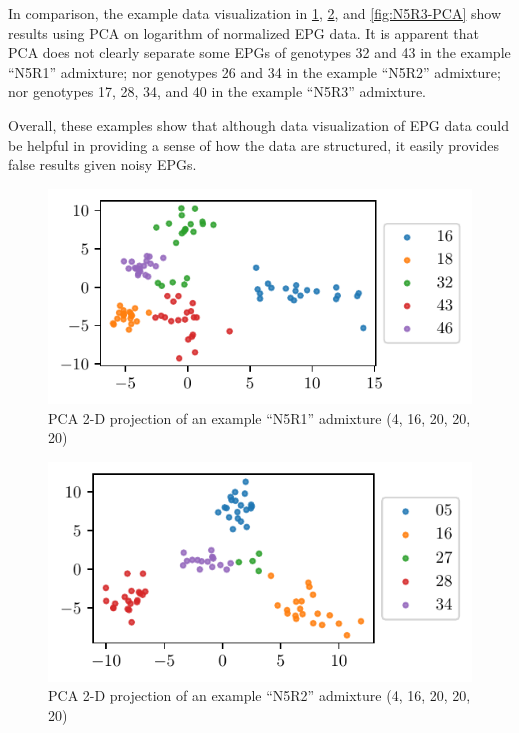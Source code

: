 In comparison, the example data visualization in \cref{fig:N5R1-PCA}, \cref{fig:N5R2-PCA}, and \cref{fig:N5R3-PCA} show results using PCA on logarithm of normalized EPG data. It is apparent that PCA does not clearly separate some EPGs of genotypes 32 and 43 in the example ``N5R1'' admixture; nor genotypes 26 and 34 in the example ``N5R2'' admixture; nor genotypes 17, 28, 34, and 40 in the example ``N5R3'' admixture.

Overall, these examples show that although data visualization of EPG data could be helpful in providing a sense of how the data are structured, it easily provides false results given noisy EPGs.

\begin{figure}
\centering
\includegraphics{./figures/data_visualization/N5R1[0]-PCA, X_heights_normalized_log.pdf}
\caption{PCA 2-D projection of an example ``N5R1'' admixture (4, 16, 20, 20, 20)}
\label{fig:N5R1-PCA}
\end{figure}
\begin{figure}
\centering
\includegraphics{./figures/data_visualization/N5R2[0]-PCA, X_heights_normalized_log.pdf}
\caption{PCA 2-D projection of an example ``N5R2'' admixture (4, 16, 20, 20, 20)}
\label{fig:N5R2-PCA}
\end{figure}
